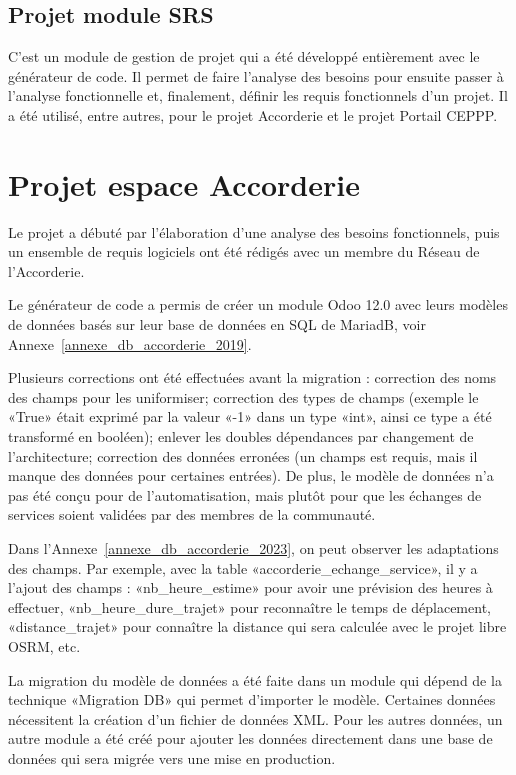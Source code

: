 \subsection{Projet module SRS}

C’est un module de gestion de projet qui a été développé entièrement avec le générateur de code. Il permet de faire l’analyse des besoins pour ensuite passer à l’analyse fonctionnelle et, finalement, définir les requis fonctionnels d’un projet. Il a été utilisé, entre autres, pour le projet Accorderie et le projet Portail CEPPP.

\section{Projet espace Accorderie}

Le projet a débuté par l'élaboration d'une analyse des besoins fonctionnels, puis un ensemble de requis logiciels ont été rédigés avec un membre du Réseau de l'Accorderie. %

Le générateur de code a permis de créer un module Odoo 12.0 avec leurs modèles de données basés sur leur base de données en SQL de MariadB, voir Annexe~\ref{annexe_db_accorderie_2019}.

Plusieurs corrections ont été effectuées avant la migration : correction des noms des champs pour les uniformiser; correction des types de champs (exemple le «True» était exprimé par la valeur «-1» dans un type «int», ainsi ce type a été transformé en booléen); enlever les doubles dépendances par changement de l’architecture; correction des données erronées (un champs est requis, mais il manque des données pour certaines entrées). De plus, le modèle de données n’a pas été conçu pour de l’automatisation, mais plutôt pour que les échanges de services soient validées par des membres de la communauté.

Dans l'Annexe~\ref{annexe_db_accorderie_2023}, on peut observer les adaptations des champs. Par exemple, avec la table «accorderie\_echange\_service», il y a l'ajout des champs : «nb\_heure\_estime» pour avoir une prévision des heures à effectuer, «nb\_heure\_dure\_trajet» pour reconnaître le temps de déplacement, «distance\_trajet» pour connaître la distance qui sera calculée avec le projet libre OSRM, etc.

La migration du modèle de données a été faite dans un module qui dépend de la technique «Migration DB» qui permet d'importer le modèle. Certaines données nécessitent la création d’un fichier de données XML. Pour les autres données, un autre module a été créé pour ajouter les données directement dans une base de données qui sera migrée vers une mise en production.

